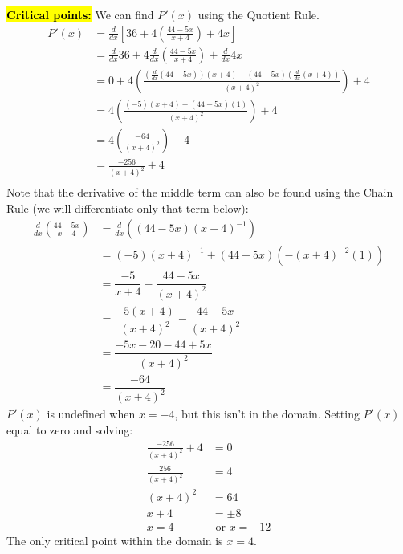\documentclass{article}
\newcommand{\highlight}[1]{\boldmath\hl{\textbf{#1}}\unboldmath}
\begin{document}
\begin{enumerate}
\begin{solution}
    \highlight{Critical points:} We can find $P'(x)$ using the Quotient Rule. 
    \begin{align*}
      P'(x) &= \frac{d}{dx} \left[36+4\left(\frac{44-5x}{x+4}\right)+4x\right] \\
      &= \frac{d}{dx}36 + 4\frac{d}{dx}\!\left(\frac{44-5x}{x+4}\right) + \frac{d}{dx}4x \\
      &= 0+ 4\left(\frac{(\frac{d}{dx}(44-5x))(x+4)-(44-5x)(\frac{d}{dx}(x+4))}{(x+4)^2} 
      \right) + 4 \\
      &= 4\left(\frac{(-5)(x+4)-(44-5x)(1)}{(x+4)^2}\right) + 4 \\
      &= 4\left(\frac{-64}{(x+4)^2}\right) +4 \\
      &= \frac{-256}{(x+4)^2} + 4 \\
    \end{align*} 
    Note that the derivative of the middle term can also be found using the Chain Rule (we will differentiate only that term below):
    \begin{align*}
        \frac{d}{dx}\!\left(\frac{44-5x}{x+4}\right) &=\frac{d}{dx}\!\left((44-5x)(x+4)^{-1}\right)\\
        &=(-5)(x+4)^{-1}+(44-5x)(-(x+4)^{-2} (1))\\
        &=\dfrac{-5}{x+4}-\dfrac{44-5x}{(x+4)^2}\\
        &= \dfrac{-5(x+4)}{(x+4)^2}-\dfrac{44-5x}{(x+4)^2}\\
        &=\dfrac{-5x-20-44+5x}{(x+4)^2}\\
        &=\dfrac{-64}{(x+4)^2}
    \end{align*}
    $P'(x)$ is undefined when $x=-4$, but this isn't in the domain. Setting $P'(x)$ equal
    to zero and solving:
    \begin{align*}
      \frac{-256}{(x+4)^2} + 4 &= 0 \\
      \frac{256}{(x+4)^2} &= 4 \\
      (x+4)^2 &= 64 \\
      x+4 &= \pm 8 \\
      x= 4 &\text{ or } x=-12
    \end{align*}
    The only critical point within the domain is $x=4$.


\end{solution}
\end{enumerate}
\end{document}

